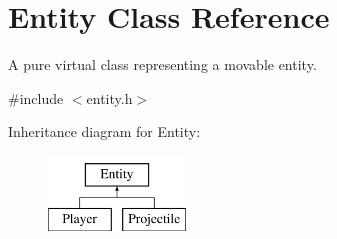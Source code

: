 \hypertarget{classEntity}{}\section{Entity Class Reference}
\label{classEntity}


A pure virtual class representing a movable entity.  




{\ttfamily \#include $<$entity.\+h$>$}

Inheritance diagram for Entity\+:\begin{figure}[H]
\begin{center}
\leavevmode
\includegraphics[height=2.000000cm]{classEntity}
\end{center}
\end{figure}
